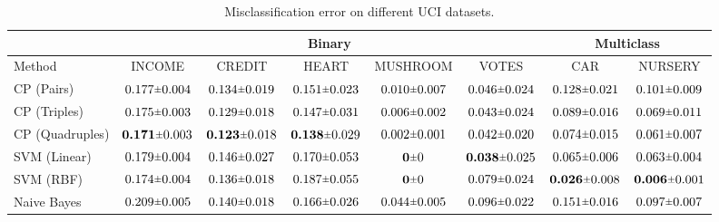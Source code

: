 \documentclass[journal]{IEEEtran}
\newcommand{\rpm}{\raisebox{.2ex}{$\scriptstyle\pm$}}
\begin{document}
\begin{table*}[!ht]
\begin{center}
\caption{Misclassification error on different UCI datasets.}
\label{table:real_exp1}
\begin{tabular}{ l|  c  c  c c c | c c }
\hline
&  \multicolumn{5}{c}{\textbf{Binary}}           &  \multicolumn{2}{c}{\textbf{Multiclass}}       \\
\hline
 Method &  INCOME   &	CREDIT   &  HEART  	& MUSHROOM    &  VOTES & CAR & NURSERY  \\
\hline
 CP (Pairs) &  $0.177 \rpm 0.004$     & $ 0.134 \rpm 0.019$	 & $0.151 \rpm 0.023$ & $0.010 \rpm 0.007$  &      $0.046  \rpm 0.024$      & $0.128  \rpm 0.021 $  &$0.101 \rpm  0.009 $ \\
 CP (Triples)     &   $0.175 \rpm 0.003$      &  $ 0.129 \rpm 0.018 $ 	 & $0.147 \rpm 0.031 $   & $0.006 \rpm 0.002 $ &     $0.043 \rpm 0.024$      & $ 0.089 \rpm 0.016 $ &$ 0.069 \rpm 0.011 $ \\
 CP (Quadruples)  &  $\textbf{0.171} \rpm 0.003 $   &   $ \textbf{0.123} \rpm 0.018$  & $ \textbf{0.138}  \rpm 0.029$   & $0.002 \rpm 0.001$ &    $0.042 \rpm 0.020$       &  $ 0.074 \rpm 0.015 $  & $ 0.061 \rpm 0.007 $ \\
\hline
 SVM (Linear)     &	$0.179 \rpm 0.004$	    &  $0.146 \rpm 0.027$  &  $0.170 \rpm 0.053 $ & $ \textbf{0} \rpm 0$   &  $\textbf{0.038} \rpm 0.025$       & $0.065 \rpm 0.006$ & $0.063 \rpm 0.004$\\
 SVM (RBF)   	  & $0.174 \rpm 0.004$        & $0.136 \rpm 0.018$   & $0.187 \rpm 0.055$   & $\textbf{0} \rpm 0$ &    $0.079 \rpm 0.024$    & $ \textbf{0.026} \rpm 0.008$ & $ \textbf{0.006} \rpm 0.001$ \\
 Naive Bayes 	  & $0.209 \rpm 0.005$        &  $0.140 \rpm 0.018$  & $0.166 \rpm 0.026$  &  $0.044 \rpm 0.005 $   &  $0.096 \rpm 0.022$         &  $0.151 \rpm 0.016$  & $0.097 \rpm 0.007$ \\
\hline
\end{tabular}
\end{center}
\end{table*}
\end{document}
